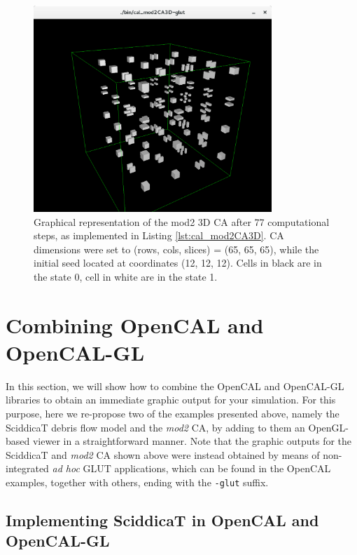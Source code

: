 \begin{figure}
  \begin{center}
    \includegraphics[width=9cm]{./images/OpenCAL/mod23DCA-glut}
    \caption{Graphical representation of the mod2 3D CA after 77 computational steps, as implemented in Listing \ref{lst:cal_mod2CA3D}. CA dimensions were set to (rows, cols, slices) = (65, 65, 65), while the initial seed located at coordinates (12, 12, 12). Cells in black are in the state 0, cell in white are in the state 1.}
    \label{fig:cal_mod2CA3D}
  \end{center}
\end{figure}


\section{Combining OpenCAL and OpenCAL-GL}\label{sec:combining_gl}

In this section, we will show how to combine the OpenCAL and
OpenCAL-GL libraries to obtain an immediate graphic output for your
simulation. For this purpose, here we re-propose two of the examples
presented above, namely the SciddicaT debris flow model and the
\emph{mod2} CA, by adding to them an OpenGL-based viewer in a
straightforward manner. Note that the graphic outputs for the
SciddicaT and \emph{mod2} CA shown above were instead obtained by
means of non-integrated \emph{ad hoc} GLUT applications, which can be
found in the OpenCAL examples, together with others, ending with the
\verb'-glut' suffix.

\subsection{Implementing SciddicaT in OpenCAL and OpenCAL-GL}\label{sec:calgl_sciddicaT}

